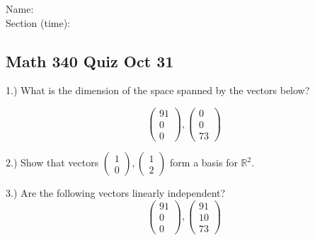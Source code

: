 \documentclass{article}
\begin{document}
Name:\\
\medskip
Section (time):

\subsection*{Math 340 Quiz Oct 31}

1.) What is the dimension of the space spanned by the vectors below?

$$ \left(\begin{array}{c}
91\\
0\\
0 \end{array}\right), \left(\begin{array}{c}
0\\
0\\
73 \end{array}\right)$$

\bigskip


2.) Show that vectors $ \left(\begin{array}{c}
1\\
0 \end{array}\right), \left(\begin{array}{c}
1 \\
2 \end{array}\right)$ form a basis for $\mathbb{R}^2$.


\pagebreak

3.) Are the following vectors linearly independent? 
$$ \left(\begin{array}{c}
91\\
0\\
0 \end{array}\right), \left(\begin{array}{c}
91\\
10\\
73 \end{array}\right)$$
\end{document}
